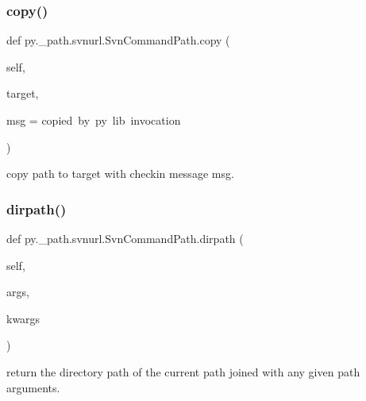\subsubsection{\texorpdfstring{copy()}{copy()}}
{\footnotesize\ttfamily def py.\+\_\+path.\+svnurl.\+Svn\+Command\+Path.\+copy (\begin{DoxyParamCaption}\item[{}]{self,  }\item[{}]{target,  }\item[{}]{msg = {\ttfamily \textquotesingle{}copied~by~py~lib~invocation\textquotesingle{}} }\end{DoxyParamCaption})}

\begin{DoxyVerb}copy path to target with checkin message msg.\end{DoxyVerb}
 \mbox{\label{classpy_1_1__path_1_1svnurl_1_1_svn_command_path_a56514d25aea1ebc54e20fabac10b98f2}} 
\subsubsection{\texorpdfstring{dirpath()}{dirpath()}}
{\footnotesize\ttfamily def py.\+\_\+path.\+svnurl.\+Svn\+Command\+Path.\+dirpath (\begin{DoxyParamCaption}\item[{}]{self,  }\item[{}]{args,  }\item[{}]{kwargs }\end{DoxyParamCaption})}

\begin{DoxyVerb}return the directory path of the current path joined
    with any given path arguments.
\end{DoxyVerb}
 \mbox{\label{classpy_1_1__path_1_1svnurl_1_1_svn_command_path_a8a262945224f11008f10757907fe3e40}} 

